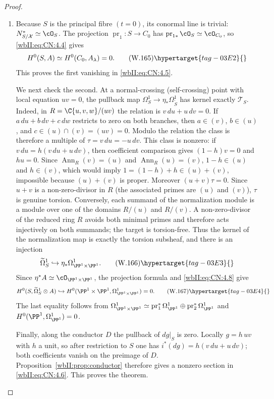 \begin{proof}
\begin{enumerate}[label={$\langle1\rangle$\arabic*.},leftmargin=*]
\item 
Because $S$ is the principal fibre $(t=0)$, its conormal line is trivial:
\(N^*_{S/\mathcal X}\simeq\cO_S\).  The projection
\(\operatorname{pr}_1:S\to C_0\) has
\(\operatorname{pr}_{1*}\cO_S\simeq\cO_{C_0}\), so \eqref{wbII:eq:CN:4.4} gives
\[
 H^0(S,A)\simeq H^0(C_0,A_\lambda)=0.
 \tag{W.165}\hypertarget{tag-03E2}{}\label{wbII:eq:CN:4.7}
\]
This proves the first vanishing in \eqref{wbII:eq:CN:4.5}.

We next check the second.  At a normal-crossing (self-crossing) point with local equation
\(uv=0\), the pullback map
\(\Omega^1_S\to\eta_*\Omega^1_{\widetilde S}\) has kernel exactly
\(\mathscr T_S\).  Indeed, in
\(R=\C\{u,v,w\}/(uv)\) the relation is
\(v\,du+u\,dv=0\).  If
\(a\,du+b\,dv+c\,dw\) restricts to zero on both branches, then
\(a\in(v)\), \(b\in(u)\), and
\(c\in(u)\cap(v)=(uv)=0\).  Modulo the relation the class is therefore a
multiple of $\tau=v\,du=-u\,dv$.  This class is nonzero: if
\(v\,du=h(v\,du+u\,dv)\), then coefficient comparison gives
  \((1-h)v=0\) and $hu=0$.  Since
\(\operatorname{Ann}_R(v)=(u)\) and \(\operatorname{Ann}_R(u)=(v)\),
\(1-h\in(u)\) and \(h\in(v)\), which would imply
\(1=(1-h)+h\in(u)+(v)\), impossible because $(u)+(v)$ is proper.
Moreover $(u+v)\tau=0$.  Since $u+v$ is a non-zero-divisor in
$R$ (the associated primes are $(u)$ and $(v)$), $\tau$ is genuine
torsion.
Conversely, each summand of the normalization module is a module over one of
the domains $R/(u)$ and $R/(v)$.  A non-zero-divisor of the reduced ring $R$
avoids both minimal primes and therefore acts injectively on both summands;
the target is torsion-free.  Thus the kernel of the normalization map is
exactly the torsion subsheaf, and there is an injection
\[
 \widetilde\Omega^1_S\hookrightarrow\eta_*\Omega^1_{\PP^1\times\PP^1}.
 \tag{W.166}\hypertarget{tag-03E3}{}\label{wbII:eq:CN:4.8}
\]
Since $\eta^*A\simeq\cO_{\PP^1\times\PP^1}$, the projection formula and \eqref{wbII:eq:CN:4.8}
give
\[
 H^0(S,\widetilde\Omega^1_S\otimes A)
 \hookrightarrow
 H^0(\PP^1\times\PP^1,\Omega^1_{\PP^1\times\PP^1})=0.
 \tag{W.167}\hypertarget{tag-03E4}{}\label{wbII:eq:CN:4.9}
\]
The last equality follows from
\(\Omega^1_{\PP^1\times\PP^1}\simeq
\operatorname{pr}_1^*\Omega^1_{\PP^1}\oplus
\operatorname{pr}_2^*\Omega^1_{\PP^1}\) and
\(H^0(\PP^1,\Omega^1_{\PP^1})=0\).

Finally, along the conductor $D$ the pullback of $dg|_S$ is zero.  Locally
$g=h\,uv$ with $h$ a unit, so after restriction to $S$ one has
$i^*(dg)=h(v\,du+u\,dv)$; both coefficients vanish on the preimage of $D$.
Proposition~\ref{wbII:prop:conductor}
therefore gives a nonzero section in \eqref{wbII:eq:CN:4.6}.  This proves the theorem.

\end{enumerate}
\end{proof}
